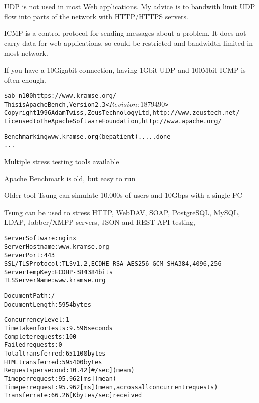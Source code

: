 \documentclass[Screen16to9,17pt]{foils}
\begin{document}

UDP is not used in most Web applications. My advice is to bandwith limit UDP flow into parts of the network with HTTP/HTTPS servers.


ICMP is a control protocol for sending messages about a problem. It does not carry data for web applications, so could be restricted and bandwidth limited in most network.

If you have a 10Gigabit connection, having 1Gbit UDP and 100Mbit ICMP is often enough.


\begin{alltt}\footnotesize
\$ ab -n 100 https://www.kramse.org/
This is ApacheBench, Version 2.3 <$Revision: 1879490 $>
Copyright 1996 Adam Twiss, Zeus Technology Ltd, http://www.zeustech.net/
Licensed to The Apache Software Foundation, http://www.apache.org/

Benchmarking www.kramse.org (be patient).....done
...
\end{alltt}

\begin{list1}
\item Multiple stress testing tools available
\item Apache Benchmark is old, but easy to run
\end{list1}

\begin{list1}
\item Older tool Tsung can simulate 10.000s of users and 10Gbps with a single PC
\item Tsung can be used to stress HTTP, WebDAV, SOAP, PostgreSQL, MySQL, LDAP, Jabber/XMPP servers, JSON and REST API testing, 
\end{list1}


\begin{alltt}
\footnotesize
Server Software:        nginx
Server Hostname:        www.kramse.org
Server Port:            443
SSL/TLS Protocol:       TLSv1.2,ECDHE-RSA-AES256-GCM-SHA384,4096,256
Server Temp Key:        ECDH P-384 384 bits
TLS Server Name:        www.kramse.org

Document Path:          /
Document Length:        5954 bytes

Concurrency Level:      1
Time taken for tests:   9.596 seconds
Complete requests:      100
Failed requests:        0
Total transferred:      651100 bytes
HTML transferred:       595400 bytes
Requests per second:    10.42 [#/sec] (mean)
Time per request:       95.962 [ms] (mean)
Time per request:       95.962 [ms] (mean, across all concurrent requests)
Transfer rate:          66.26 [Kbytes/sec] received
\end{alltt}
\end{document}
